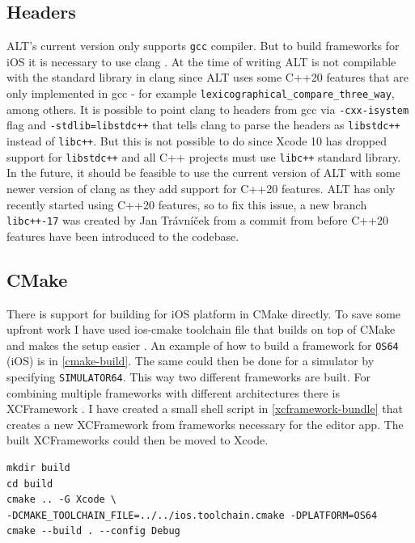 \subsection{Headers}
ALT's current version only supports \lstinline{gcc} compiler. But to build frameworks for iOS it is necessary to use clang \cite{clang}. At the time of writing ALT is not compilable with the standard library in clang since ALT uses some C++20 features that are only implemented in gcc - for example \lstinline{lexicographical_compare_three_way}, among others. It is possible to point clang to headers from gcc via \lstinline{-cxx-isystem} flag and \lstinline{-stdlib=libstdc++} that tells clang to parse the headers as \lstinline{libstdc++} instead of \lstinline{libc++}. But this is not possible to do since Xcode 10 has dropped support for \lstinline{libstdc++} and all C++ projects must use \lstinline{libc++} standard library. In the future, it should be feasible to use the current version of ALT with some newer version of clang as they add support for C++20 features. ALT has only recently started using C++20 features, so to fix this issue, a new branch \lstinline{libc++-17} was created by Jan Trávníček from a commit from before C++20 features have been introduced to the codebase.

\subsection{CMake}

There is support for building for iOS platform in CMake directly. To save some upfront work I have used ios-cmake toolchain file that builds on top of CMake and makes the setup easier \cite{ios-cmake}. An example of how to build a framework for \lstinline{OS64} (iOS) is in \ref{cmake-build}. The same could then be done for a simulator by specifying \lstinline{SIMULATOR64}. This way two different frameworks are built. For combining multiple frameworks with different architectures there is XCFramework \cite{xcframework}. I have created a small shell script in \ref{xcframework-bundle} that creates a new XCFramework from frameworks necessary for the editor app. The built XCFrameworks could then be moved to Xcode.

\begin{lstlisting}[caption=CMake build instructions, label=cmake-build]
mkdir build
cd build
cmake .. -G Xcode \
-DCMAKE_TOOLCHAIN_FILE=../../ios.toolchain.cmake -DPLATFORM=OS64
cmake --build . --config Debug
\end{lstlisting}

